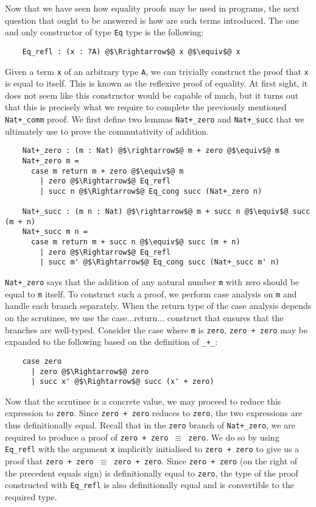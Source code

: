 \documentclass[12pt,twoside,maitrise]{dms}
\theoremstyle{definition}
\numberwithin{equation}{section}
\numberwithin{table}{chapter}
\numberwithin{figure}{chapter}
\newcommand\kw[1] {\textsf{#1}}
\newcommand\id[1] {\texttt{#1}}
\newcommand\fn[1] {\texttt{#1}}
\begin{document}
Now that we have seen how equality proofs may be used in programs, the next
question that ought to be answered is how are such terms introduced. The one and
only constructor of type \id{Eq} type is the following:

\begin{verbatim}
    Eq_refl : (x : ?A) @$\Rrightarrow$@ x @$\equiv$@ x
\end{verbatim}

Given a term \id{x} of an arbitrary type \id{A}, we can trivially construct the
proof that \id{x} is equal to itself. This is known as the reflexive proof of
equality. At first sight, it does not seem like this constructor would be
capable of much, but it turns out that this is precisely what we require to
complete the previously mentioned \id{Nat+\_comm} proof. We first define two
lemmas \id{Nat+\_zero} and \id{Nat+\_succ} that we ultimately use to prove the
commutativity of addition.

\begin{verbatim}
    Nat+_zero : (m : Nat) @$\rightarrow$@ m + zero @$\equiv$@ m
    Nat+_zero m =
      case m return m + zero @$\equiv$@ m
        | zero @$\Rightarrow$@ Eq_refl
        | succ n @$\Rightarrow$@ Eq_cong succ (Nat+_zero n)

    Nat+_succ : (m n : Nat) @$\rightarrow$@ m + succ n @$\equiv$@ succ (m + n)
    Nat+_succ m n =
      case m return m + succ n @$\equiv$@ succ (m + n)
        | zero @$\Rightarrow$@ Eq_refl
        | succ m' @$\Rightarrow$@ Eq_cong succ (Nat+_succ m' n)
\end{verbatim}

\id{Nat+\_zero} says that the addition of any natural number \id{m} with zero
should be equal to \id{m} itself. To construct such a proof, we perform case
analysis on \id{m} and handle each branch separately. When the return type of
the case analysis depends on the scrutinee, we use the \kw{case...return...}
construct that ensures that the branches are well-typed. Consider the case
where \id{m} is \id{zero}, \fn{zero + zero} may be expanded to the following
based on the definition of \id{_+_}:

\begin{verbatim}
    case zero
      | zero @$\Rightarrow$@ zero
      | succ x' @$\Rightarrow$@ succ (x' + zero)
\end{verbatim}

Now that the scrutinee is a concrete value, we may proceed to reduce this
expression to \id{zero}. Since \fn{zero + zero} reduces to \id{zero}, the two
expressions are thus definitionally equal. Recall that in the \id{zero} branch
of \id{Nat+_zero}, we are required to produce a proof of \fn{zero + zero
$\equiv$ zero}. We do so by using \id{Eq\_refl} with the argument \id{x}
implicitly initialised to \fn{zero + zero} to give us a proof that \fn{zero +
zero $\equiv$ zero + zero}. Since \fn{zero + zero} (on the right of the
precedent equals sign) is definitionally equal to \id{zero}, the type of the
proof constructed with \id{Eq\_refl} is also definitionally equal and is
convertible to the required type.
\end{document}
